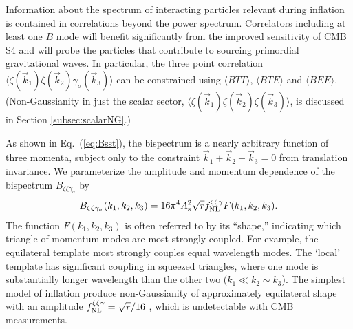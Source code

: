 Information about the spectrum of interacting particles relevant during inflation is contained in correlations beyond the power spectrum. Correlators including at least one $B$ mode will benefit significantly from the improved sensitivity of CMB S4 and will probe the particles that contribute to sourcing primordial gravitational waves. In particular, the three point correlation $\langle \zeta(\vec{k}_1)\zeta(\vec{k}_2)\gamma_\sigma(\vec{k}_3) \rangle$ can be constrained using $\langle BTT\rangle$, $\langle BTE\rangle $ and $\langle BEE\rangle$. (Non-Gaussianity in just the scalar sector, $\langle \zeta(\vec{k}_1)\zeta(\vec{k}_2)\zeta(\vec{k}_3) \rangle$, is discussed in Section \ref{subsec:scalarNG}.) 

As shown in Eq.~(\ref{eq:Bsst}), the bispectrum is a nearly arbitrary function of three momenta, subject only to the constraint $\vec{k}_1+\vec{k}_2+\vec{k}_3=0$ from translation invariance. We parameterize the amplitude and momentum dependence of the bispectrum $B_{\zeta\zeta\gamma_\sigma}$ by \cite{Meerburg:2016ecv}
\begin{equation}
\label{eq:Bzzg}
B_{\zeta\zeta\gamma_\sigma}(k_1,k_2,k_3)= 16 \pi^4 A_{\rm s}^2 \sqrt{r}f_\mathrm{NL}^{\zeta\zeta\gamma} F(k_1,k_2,k_3).
\end{equation} 
The function $F(k_1,k_2,k_3)$ is often referred to by its ``shape,'' indicating which triangle of momentum modes are most strongly coupled.  For example, the equilateral template most strongly couples equal wavelength modes. The `local' template has significant coupling in squeezed triangles, where one mode is substantially longer wavelength than the other two ($k_1\ll k_2\sim k_3$). The simplest model of inflation produce non-Gaussianity of approximately equilateral shape with an amplitude $f^{\zeta \zeta\gamma }_{\rm NL} = \sqrt{r}/16$ \cite{Maldacena:2002vr,Maldacena:2011nz}, which is undetectable with CMB measurements. 

